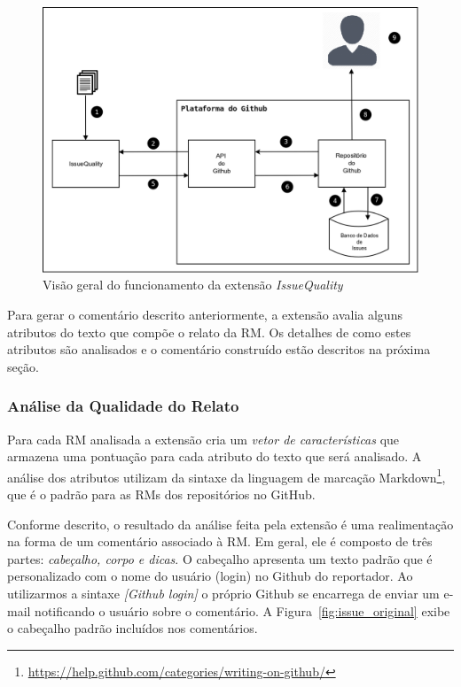 \begin{figure}[htpb]
    \centering
    \includegraphics[width=0.7\linewidth]{chapter-implementacao-extensoes-fgrm/img/diagrama_funcionamento_issuequality.png}
    \caption{Visão geral do funcionamento da extensão \textit{IssueQuality}}
\label{fig:diagrama_funcionamento_issuequality}
\end{figure}

Para gerar o comentário descrito anteriormente, a extensão avalia alguns
atributos do texto que compõe o relato da RM\@. Os detalhes de como estes
atributos são analisados e o comentário construído estão descritos na próxima
seção.

\subsubsection{Análise da Qualidade do Relato}
\label{ssub:implementacao_extensao_analise_qualidade_do_relato}

Para cada RM analisada a extensão cria um \textit{vetor de características} que
armazena uma pontuação para cada atributo do texto que será analisado. A análise
dos atributos utilizam da sintaxe da linguagem de marcação
Markdown\footnote{\url{https://help.github.com/categories/writing-on-github/}},
que é o padrão para as RMs dos repositórios no GitHub.

Conforme descrito, o resultado da análise feita pela extensão é uma
realimentação na forma de um comentário associado à RM\@. Em geral, ele é
composto de três partes: \textit{cabeçalho, corpo e dicas}. O cabeçalho
apresenta um texto padrão que é personalizado com o nome do usuário (login) no
Github do reportador. Ao utilizarmos a sintaxe \textit{\@[Github login]} o
próprio Github se encarrega de enviar um e-mail notificando o usuário sobre o
comentário. A Figura~\ref{fig:issue_original} exibe o cabeçalho padrão incluídos
nos comentários.

